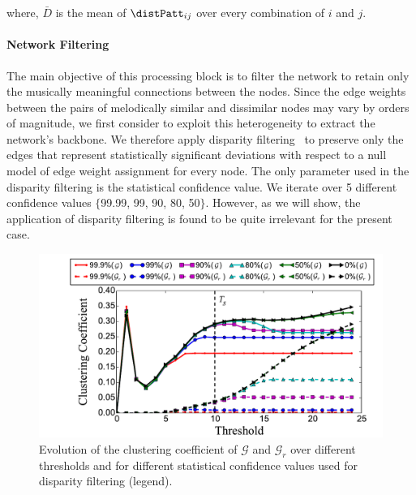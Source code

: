 {\noindent where, $\bar{D}$ is the mean of $\distPatt_{ij}$ over every combination of $i$ and $j$. 


\paragraph{Network Filtering}
\label{sec:network_filtering}

The main objective of this processing block is to filter the network to retain only the musically meaningful connections between the nodes. Since the edge weights between the pairs of melodically similar and dissimilar nodes may vary by orders of magnitude, we first consider to exploit this heterogeneity to extract the network's backbone. We therefore apply disparity filtering~\citep{Serrano09PNAS} to preserve only the edges that represent statistically significant deviations with respect to a null model of edge weight assignment for every node. The only parameter used in the disparity filtering is the statistical confidence value. We iterate over 5 different confidence values $\lbrace$99.99, 99, 90, 80, 50$\rbrace$. However, as we will show, the application of disparity filtering is found to be quite irrelevant for the present case.

\begin{figure}
	\begin{center}
		\includegraphics[width=\figSizeHundred]{ch06_patterns/figures/Characterization/CC_Curves_shrunk.pdf}
	\end{center}
	\caption{Evolution of the clustering coefficient of $\mathcal{G}$ and $\mathcal{G}_r$ over different thresholds and for different statistical confidence values used for disparity filtering (legend).}
	\label{fig:cc_curve_pattern_characterization}
\end{figure}

}
